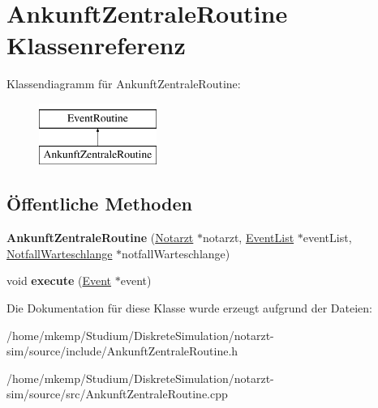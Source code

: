 \hypertarget{classAnkunftZentraleRoutine}{}\section{Ankunft\+Zentrale\+Routine Klassenreferenz}
\label{classAnkunftZentraleRoutine}
Klassendiagramm für Ankunft\+Zentrale\+Routine\+:\begin{figure}[H]
\begin{center}
\leavevmode
\includegraphics[height=2.000000cm]{classAnkunftZentraleRoutine}
\end{center}
\end{figure}
\subsection*{Öffentliche Methoden}
\begin{DoxyCompactItemize}
\item 
{\bfseries Ankunft\+Zentrale\+Routine} (\hyperlink{classNotarzt}{Notarzt} $\ast$notarzt, \hyperlink{classEventList}{Event\+List} $\ast$event\+List, \hyperlink{classNotfallWarteschlange}{Notfall\+Warteschlange} $\ast$notfall\+Warteschlange)\hypertarget{classAnkunftZentraleRoutine_a04a836512c946b6486b0c27500c3f220}{}\label{classAnkunftZentraleRoutine_a04a836512c946b6486b0c27500c3f220}

\item 
void {\bfseries execute} (\hyperlink{classEvent}{Event} $\ast$event)\hypertarget{classAnkunftZentraleRoutine_ab6d6422067bb87d64f4973c68c6d796a}{}\label{classAnkunftZentraleRoutine_ab6d6422067bb87d64f4973c68c6d796a}

\end{DoxyCompactItemize}


Die Dokumentation für diese Klasse wurde erzeugt aufgrund der Dateien\+:\begin{DoxyCompactItemize}
\item 
/home/mkemp/\+Studium/\+Diskrete\+Simulation/notarzt-\/sim/source/include/Ankunft\+Zentrale\+Routine.\+h\item 
/home/mkemp/\+Studium/\+Diskrete\+Simulation/notarzt-\/sim/source/src/Ankunft\+Zentrale\+Routine.\+cpp\end{DoxyCompactItemize}
